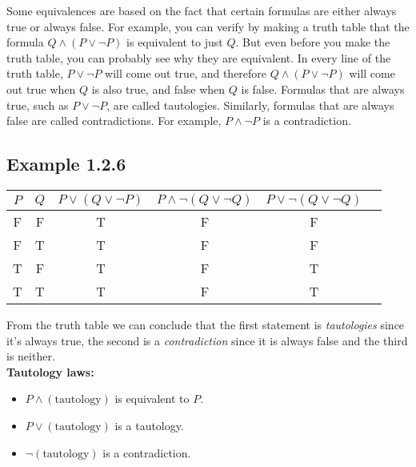 \documentclass{article} %
\begin{document}
    Some equivalences are based on the fact that certain formulas are either always true or always false. For example, you can verify by making a truth table that the formula $Q \land (P \lor \neg P)$ is equivalent to just $Q$. But even before you make the truth table, you can probably see why they are equivalent. In every line of the truth table, $P \lor \neg P$ will come out true, and therefore $Q \land (P \lor \neg P)$ will come out true when $Q$ is also true, and false when $Q$ is false. Formulas that are always true, such as $P \lor \neg P$, are called tautologies. Similarly, formulas that are always false are called contradictions. For example, $P \land \neg P$ is a contradiction.

    \newpage
    \subsection*{Example 1.2.6}
    \begin{table}[htbp]
        \label{tab:logical_table}
        \begin{tabular}{cccccc}
            $P$ & $Q$ & $P \lor (Q \lor \neg P)$ & $P \land \neg(Q \lor \neg Q)$ & $P \lor \neg(Q \lor \neg Q)$ \\
            \midrule
            F   & F   & T                       & F                           & F                           \\
            F   & T   & T                       & F                           & F                           \\
            T   & F   & T                       & F                           & T                           \\
            T   & T   & T                       & F                           & T                           \\
        \end{tabular}
    \end{table}

    From the truth table we can conclude that the first statement is \emph{tautologies} since it's always true, the second is a \emph{contradiction} since it is always false and the third is neither. \\

    \textbf{Tautology laws:}
    \begin{itemize}[itemsep=5pt,parsep=0pt,topsep=5pt]
        \item \begin{center}$P \land (\text{tautology})$ is equivalent to $P$.\end{center}
        \item \begin{center}$P \lor (\text{tautology})$ is a tautology.\end{center}
        \item \begin{center}$\neg(\text{tautology})$ is a contradiction.\end{center}
    \end{itemize}
\end{document}
